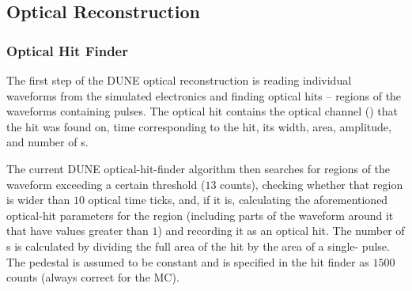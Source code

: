 


\subsection{Optical Reconstruction}

\subsubsection{Optical Hit Finder}
\label{sec:OpticalHitFinder}
The first step of the DUNE optical reconstruction is reading
individual waveforms from the simulated  electronics
and finding optical hits -- regions of the waveforms containing pulses.
The optical hit contains the optical channel () that the hit
was found on, time corresponding to the hit, its width,
area, amplitude, and number of \phel{}s.


The current DUNE optical-hit-finder algorithm then searches for regions of the waveform
exceeding a certain threshold ($13$  counts), checking whether that region
is wider than $10$ optical time ticks, and, if it is, calculating the aforementioned
optical-hit parameters for the region (including parts of the waveform around it
that have  values greater than $1$) and recording it as an optical hit.
The number of \phel{}s is calculated by dividing the full area of the hit
by the area of a single-\phel{} pulse.
The pedestal is assumed to be constant and is specified in the hit finder as $1500$  counts (always correct for the MC).


